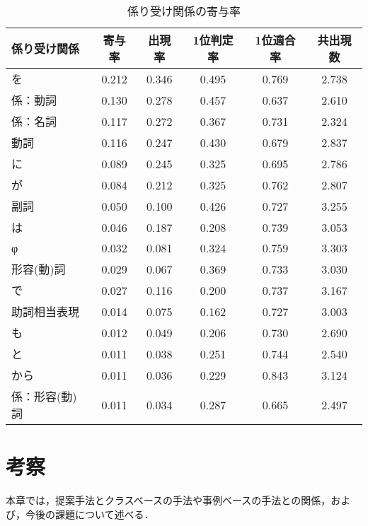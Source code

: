 \begin{table}[htbp]
   \begin{center}
      \leavevmode
      \begin{tabular}{l|ccccc}
係り受け関係 & 寄与率 & 出現率 &  1位判定率 &  1位適合率 & 共出現数\\ \hline
        を   &  0.212 &  0.346 &      0.495 &      0.769 &  2.738\\
  係：動詞   &  0.130 &  0.278 &      0.457 &      0.637 &  2.610\\
  係：名詞   &  0.117 &  0.272 &      0.367 &      0.731 &  2.324\\
      動詞   &  0.116 &  0.247 &      0.430 &      0.679 &  2.837\\
        に   &  0.089 &  0.245 &      0.325 &      0.695 &  2.786\\
        が   &  0.084 &  0.212 &      0.325 &      0.762 &  2.807\\
      副詞   &  0.050 &  0.100 &      0.426 &      0.727 &  3.255\\ \hline
        は   &  0.046 &  0.187 &      0.208 &      0.739 &  3.053\\
        φ   &  0.032 &  0.081 &      0.324 &      0.759 &  3.303\\
形容(動)詞   &  0.029 &  0.067 &      0.369 &      0.733 &  3.030\\
        で   &  0.027 &  0.116 &      0.200 &      0.737 &  3.167\\
助詞相当表現 &  0.014 &  0.075 &      0.162 &      0.727 &  3.003\\
        も   &  0.012 &  0.049 &      0.206 &      0.730 &  2.690\\
        と   &  0.011 &  0.038 &      0.251 &      0.744 &  2.540\\
      から   &  0.011 &  0.036 &      0.229 &      0.843 &  3.124\\
係：形容(動)詞 &  0.011 &  0.034 &      0.287 &      0.665 &  2.497\\
       \end{tabular}
   \end{center}
   \caption{係り受け関係の寄与率}
   \label{tab:contrib}
\end{table}

\section{考察}
\label{sec:discussion}

本章では，提案手法とクラスベースの手法や事例ベースの手法との関係，およ
び，今後の課題について述べる．


